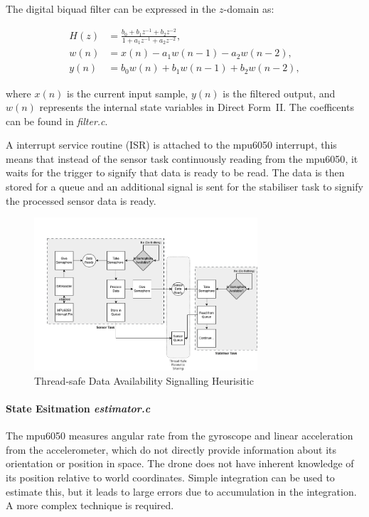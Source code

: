 The digital biquad filter can be expressed in the $z$-domain as:

\begin{align}
H(z) &= \frac{b_0 + b_1 z^{-1} + b_2 z^{-2}}{1 + a_1 z^{-1} + a_2 z^{-2}}, \\[6pt]
w(n) &= x(n) - a_1 w(n-1) - a_2 w(n-2), \\[6pt]
y(n) &= b_0 w(n) + b_1 w(n-1) + b_2 w(n-2),
\end{align}

where \( x(n) \) is the current input sample, \( y(n) \) is the filtered output, and \( w(n) \) represents the internal state variables in Direct Form~II. The coefficents can be found in \textit{filter.c}.

A interrupt service routine (ISR) is attached to the \gls{mpu6050} interrupt, this means that instead of the sensor task continuously reading from the \gls{mpu6050}, it waits for the trigger to signify that data is ready to be read. The data is then stored for a queue and an additional signal is sent for the stabiliser task to signify the processed sensor data is ready.

\begin{figure}[H]
    \centering
    \captionsetup{justification=centering, margin=1cm}
    \includegraphics[width=0.74\textwidth]{img/sensor-semaphore.PNG}
    \caption{Thread-safe Data Availability Signalling Heurisitic}
    \label{fig:arch-process}
\end{figure}


\paragraph{\textbf{State Esitmation} \textit{estimator.c}} \leavevmode 

The \gls{mpu6050} measures angular rate from the gyroscope and linear acceleration from the accelerometer, which do not directly provide information about its orientation or position in space. The drone does not have inherent knowledge of its position relative to world coordinates. Simple integration can be used to estimate this, but it leads to large errors due to accumulation in the integration. A more complex technique is required.

